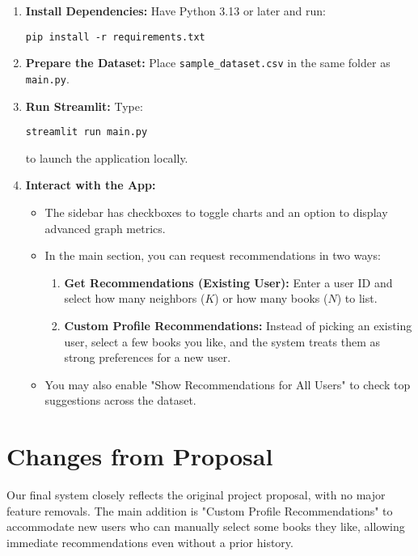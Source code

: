 \documentclass[12pt]{article}
\begin{document}
\begin{enumerate}
\item \textbf{Install Dependencies:} Have Python 3.13 or later and run:
\begin{verbatim}
pip install -r requirements.txt
\end{verbatim}

\item \textbf{Prepare the Dataset:} Place \texttt{sample\_dataset.csv} in the same folder as \texttt{main.py}.

\item \textbf{Run Streamlit:} Type:
\begin{verbatim}
streamlit run main.py
\end{verbatim}
to launch the application locally.

\item \textbf{Interact with the App:}
    \begin{itemize}
        \item The sidebar has checkboxes to toggle charts and an option to display advanced graph metrics.
        \item In the main section, you can request recommendations in two ways:
        \begin{enumerate}
            \item \textbf{Get Recommendations (Existing User):} Enter a user ID and select how many neighbors ($K$) or how many books ($N$) to list. 
            \item \textbf{Custom Profile Recommendations:} Instead of picking an existing user, select a few books you like, and the system treats them as strong preferences for a new user.
        \end{enumerate}
        \item You may also enable "Show Recommendations for All Users" to check top suggestions across the dataset.
    \end{itemize}
\end{enumerate}

\section{Changes from Proposal}

Our final system closely reflects the original project proposal, with no major feature removals. The main addition is "Custom Profile Recommendations" to accommodate new users who can manually select some books they like, allowing immediate recommendations even without a prior history.
\end{document}
